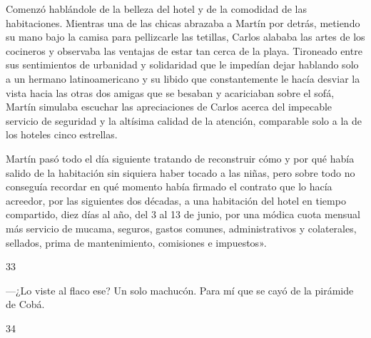 \documentclass[12pt,twoside,openright,a5paper]{book}
\begin{document}
Comenzó hablándole de la belleza del hotel y de la comodidad de las
habitaciones. Mientras una de las chicas abrazaba a Martín por detrás,
metiendo su mano bajo la camisa para pellizcarle las tetillas, Carlos alababa
las artes de los cocineros y observaba las ventajas de estar tan cerca de
la playa. Tironeado entre sus sentimientos de urbanidad y solidaridad que le
impedían dejar hablando solo a un hermano latinoamericano y su libido
que constantemente le hacía desviar la vista hacia las otras dos amigas
que se besaban y acariciaban sobre el sofá, Martín simulaba escuchar
las apreciaciones de Carlos acerca del impecable servicio de seguridad y
la altísima calidad de la atención, comparable solo a la de los hoteles
cinco estrellas.

Martín pasó todo el día siguiente tratando de reconstruir cómo y por qué
había salido de la habitación sin siquiera haber tocado a las niñas, pero
sobre todo no conseguía recordar en qué momento había firmado el contrato
que lo hacía acreedor, por las siguientes dos décadas, a una habitación
del hotel en tiempo compartido, diez días al año, del 3 al 13 de junio,
por una módica cuota mensual más servicio de mucama, seguros, gastos
comunes, administrativos y colaterales, sellados, prima de mantenimiento,
comisiones e impuestos».

\vspace{0.5cm}

\hrulefill \hspace{0.1cm}\decofourleft\hspace{0.2cm} 33 \hspace{0.2cm}\decofourright \hspace{0.1cm}\hrulefill

\nopagebreak

\vspace{0.5cm}

\nopagebreak

---¿Lo viste al flaco ese? Un solo machucón. Para mí que se cayó de la
pirámide de Cobá.


\vspace{0.5cm}
\afterpage{}
\hrulefill \hspace{0.1cm}\decofourleft\hspace{0.2cm} 34 \hspace{0.2cm}\decofourright \hspace{0.1cm}\hrulefill

\nopagebreak

\vspace{0.5cm}
\end{document}
